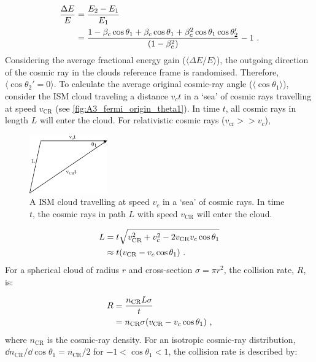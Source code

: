 \begin{equation}
    \begin{aligned}
        \frac{\Delta E}{E}&=\frac{E_2-E_1}{E_1} \\
        &=\frac{1-\beta_c\cos\theta_1+\beta_c\cos\theta_1+\beta_c^2\cos\theta_1\cos\theta_2'}{\qty(1-\beta_c^2)}-1\text{ .}
    \end{aligned} \label{eq:A3_DSA_fermi_orig_frac_energy}
\end{equation}
\noindent Considering the average fractional energy gain ($\langle \Delta E/E \rangle$), the outgoing direction of the cosmic ray in the clouds reference frame is randomised. Therefore, $\langle \cos\theta_2'=0 \rangle$. To calculate the average original cosmic-ray angle ($\langle \cos\theta_1 \rangle$), consider the ISM cloud traveling a distance $v_ct$ in a `sea' of cosmic rays travelling at speed $v_\text{CR}$ (see \autoref{fig:A3_fermi_origin_theta1}). In time $t$, all cosmic rays in length $L$ will enter the cloud. For relativistic cosmic rays ($v_\text{cr}>>v_c$),
\begin{figure}
    \centering
    \includegraphics[width=0.3\textwidth]{A3_Diffusive_Shock_Acceleration/Images/fermi_original_theta1.png}
    \caption{A ISM cloud travelling at speed $v_c$ in a `sea' of cosmic rays. In time $t$, the cosmic rays in path $L$ with speed $v_\text{CR}$ will enter the cloud.}
    \label{fig:A3_fermi_origin_theta1}
\end{figure}
\begin{equation}
    \begin{aligned}
        L&=t\sqrt{v_\text{CR}^2+v_c^2-2v_\text{CR}v_c\cos\theta_1} \\
        &\approx t\qty(v_\text{CR}-v_c\cos\theta_1) \text{ .}
    \end{aligned}
\end{equation}
\noindent For a spherical cloud of radius $r$ and cross-section $\sigma=\pi r^2$, the collision rate, $R$, is:

\begin{equation}
    \begin{aligned}
        R&=\frac{n_\text{CR}L\sigma}{t} \\
        &=n_\text{CR}\sigma\qty(v_\text{CR}-v_c\cos\theta_1) \text { ,}
    \end{aligned}
\end{equation}
\noindent where $n_\text{CR}$ is the cosmic-ray density. For an isotropic cosmic-ray distribution, $\dd{n_\text{CR}}/\dd{\cos\theta_1}=n_\text{CR}/2$ for $-1<\cos\theta_1<1$, the collision rate is described by:

